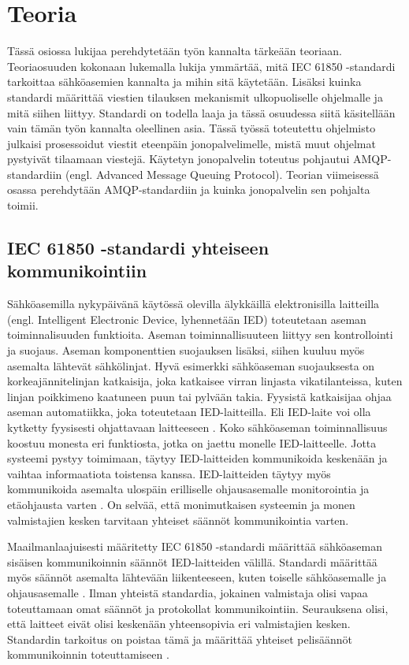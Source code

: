 \chapter{Teoria}
\label{ch:teoria}
Tässä osiossa lukijaa perehdytetään työn kannalta tärkeään teoriaan. Teoriaosuuden kokonaan lukemalla lukija ymmärtää, mitä IEC 61850 -standardi tarkoittaa sähköasemien kannalta ja mihin sitä käytetään. Lisäksi kuinka standardi määrittää viestien tilauksen mekanismit ulkopuoliselle ohjelmalle ja mitä siihen liittyy. Standardi on todella laaja ja tässä osuudessa siitä käsitellään vain tämän työn kannalta oleellinen asia. Tässä työssä toteutettu ohjelmisto julkaisi prosessoidut viestit eteenpäin jonopalvelimelle, mistä muut ohjelmat pystyivät tilaamaan viestejä. Käytetyn jonopalvelin toteutus pohjautui AMQP-standardiin (engl. Advanced Message Queuing Protocol). Teorian viimeisessä osassa perehdytään AMQP-standardiin ja kuinka jonopalvelin sen pohjalta toimii.


\section{IEC 61850 -standardi yhteiseen kommunikointiin}
Sähköasemilla nykypäivänä käytössä olevilla älykkäillä elektronisilla laitteilla (engl. Intelligent Electronic Device, lyhennetään IED) toteutetaan aseman toiminnalisuuden funktioita. Aseman toiminnallisuuteen liittyy sen kontrollointi ja suojaus. Aseman komponenttien suojauksen lisäksi, siihen kuuluu myös asemalta lähtevät sähkölinjat. Hyvä esimerkki sähköaseman suojauksesta on korkeajännitelinjan katkaisija, joka katkaisee virran linjasta vikatilanteissa, kuten linjan poikkimeno kaatuneen puun tai pylvään takia. Fyysistä katkaisijaa ohjaa aseman automatiikka, joka toteutetaan IED-laitteilla. Eli IED-laite voi olla kytketty fyysisesti ohjattavaan laitteeseen \cite[s.~63--64]{IEC61850-7-1}. Koko sähköaseman toiminnallisuus koostuu monesta eri funktiosta, jotka on jaettu monelle IED-laitteelle. Jotta systeemi pystyy toimimaan, täytyy IED-laitteiden kommunikoida keskenään ja vaihtaa informaatiota toistensa kanssa. IED-laitteiden täytyy myös kommunikoida asemalta ulospäin erilliselle ohjausasemalle monitorointia ja etäohjausta varten \cite[s.~1]{Brunner2008}. On selvää, että monimutkaisen systeemin ja monen valmistajien kesken tarvitaan yhteiset säännöt kommunikointia varten.

Maailmanlaajuisesti määritetty IEC 61850 -standardi määrittää sähköaseman sisäisen kommunikoinnin säännöt IED-laitteiden välillä. Standardi määrittää myös säännöt asemalta lähtevään liikenteeseen, kuten toiselle sähköasemalle ja ohjausasemalle \cite[s.~10]{IEC61850-7-1}. Ilman yhteistä standardia, jokainen valmistaja olisi vapaa toteuttamaan omat säännöt ja protokollat kommunikointiin. Seurauksena olisi, että laitteet eivät olisi keskenään yhteensopivia eri valmistajien kesken. Standardin tarkoitus on poistaa tämä ja määrittää yhteiset pelisäännöt kommunikoinnin toteuttamiseen \cite[s.~1]{Kaneda2008}.

